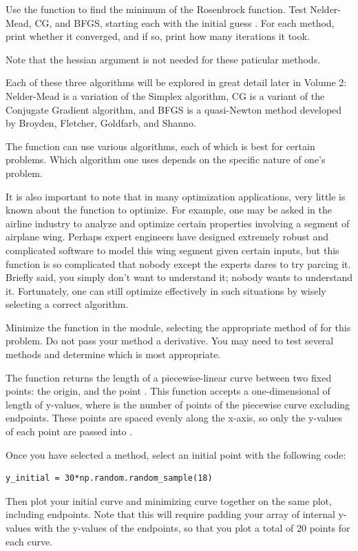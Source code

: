 \begin{problem} %
Use the  function to find the minimum of the Rosenbrock function.
Test Nelder-Mead, CG, and BFGS, starting each with the initial guess .
For each method, print whether it converged, and if so, print how many iterations it took.

Note that the hessian argument is not needed for these paticular methods. 
\end{problem}

Each of these three algorithms will be explored in great detail later in Volume 2: Nelder-Mead is a variation of the Simplex algorithm, CG is a variant of the Conjugate Gradient algorithm, and BFGS is a quasi-Newton method developed by Broyden, Fletcher, Goldfarb, and Shanno.

The  function can use various algorithms, each of which is best for certain problems.  
Which algorithm one uses depends on the specific nature of one's problem. 

It is also important to note that in many optimization applications, very little is known about the function to optimize. 
For example, one may be asked in the airline industry to analyze and optimize certain properties involving a segment of airplane wing. 
Perhaps expert engineers have designed extremely robust and complicated software to model this wing segment given certain inputs, but this function is so complicated that nobody except the experts dares to try parcing it.
Briefly said, you simply don't want to understand it; nobody wants to understand it. 
Fortunately, one can still optimize effectively in such situations by wisely selecting a correct algorithm.

\begin{problem} %
Minimize the function  in the  module, selecting the appropriate method of  for this problem.  
Do not pass your method a derivative. 
You may need to test several methods and determine which is most appropriate.

The function  returns the length of a piecewise-linear curve between two fixed points: the origin, and the point .
This function accepts a one-dimensional  of length  of y-values, where  is the number of points of the piecewise curve excluding endpoints.
These points are spaced evenly along the x-axis, so only the y-values of each point are passed into .

Once you have selected a method, select an initial point with the following code:

\begin{lstlisting}
y_initial = 30*np.random.random_sample(18)
\end{lstlisting}

Then plot your initial curve and minimizing curve together on the same plot, including endpoints.
Note that this will require padding your array of internal y-values with the y-values of the endpoints, so that you plot a total of 20 points for each curve.
\end{problem}

